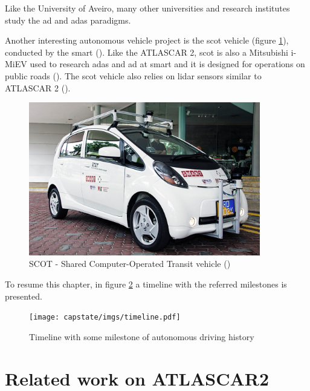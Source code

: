 Like the University of Aveiro, many other universities and research institutes study the \gls{ad} and \gls{adas} paradigms.

Another interesting autonomous vehicle project is the \gls{scot} vehicle (figure \ref{fig:scot}), conducted by the \gls{smart} (\cite{Singapore-MITAllianceforResearchandTechnology}). Like the ATLASCAR 2, \gls{scot} is also a Mitsubishi i-MiEV used to research \gls{adas} and \gls{ad} at \gls{smart} and it is designed for operations on public roads (\cite{AndreasHerrmannWalterBrenner2018}). The \gls{scot} vehicle also relies on \gls{lidar} sensors similar to ATLASCAR 2 (\cite{Teo}). 

\begin{figure}[htp]
	
	\centering
	\includegraphics[width=0.9\textwidth]{capstate/imgs/scot}
	
	\caption{SCOT - Shared Computer-Operated Transit vehicle (\cite{Singapore-MITAllianceforResearchandTechnology})}
	\label{fig:scot}
	
\end{figure}

To resume this chapter, in figure \ref{fig:timeline} a timeline with the referred milestones is presented.

\begin{figure}[htp]
	
	\centering
	\texttt{[image: capstate/imgs/timeline.pdf]}
	
	\caption{Timeline with some milestone of autonomous driving history}
	\label{fig:timeline}
	
\end{figure}

\section{Related work on ATLASCAR2}


